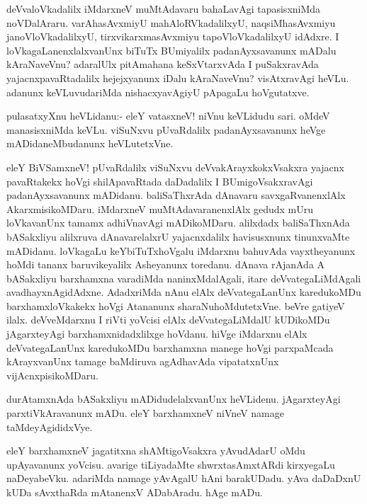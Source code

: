 \begin{mng}
deVvaloVkadalilx iMdarxneV muMtAdavaru bahaLavAgi tapasisxniMda noVDalAraru. varAhasAvxmiyU mahAloRVkadalilxyU, naqsiMhasAvxmiyu janoVloVkadalilxyU, tirxvikarxmasAvxmiyu tapoVloVkadalilxyU idAdxre. I loVkagaLanenxlalxvanUnx biTuTx BUmiyalilx padanAyxsavanunx mADalu kAraNaveVnu? adaralUlx pitAmahana keSxVtarxvAda I puSakxravAda yajacnxpavaRtadalilx hejejxyanunx iDalu kAraNaveVnu? visAtxravAgi heVLu. adanunx keVLuvudariMda nishacxyavAgiyU pApagaLu hoVgutatxve.
\end{mng}

\begin{mng}
pulasatxyXnu heVLidanu:- eleY vatasxneV! niVnu keVLidudu sari. oMdeV manasisxniMda keVLu. viSuNxvu pUvaRdalilx padanAyxsavanunx heVge mADidaneMbudanunx heVLutetxVne.
\end{mng}

\begin{mng}
eleY BiVSamxneV! pUvaRdalilx viSuNxvu deVvakArayxkokxVsakxra yajacnx pavaRtakekx hoVgi shilApavaRtada daDadalilx I BUmigoVsakxravAgi padanAyxsavanunx mADidanu. baliSaThxrAda dAnavaru savxgaRvanenxlAlx AkarxmisikoMDaru. iMdarxneV muMtAdavaranenxlAlx gedudx mUru loVkavanUnx tamamx adhiVnavAgi mADikoMDaru. alilxdadx baliSaThxnAda bASakxliyu alilxruva dAnavarelalxrU yajacnxdalilx havisusxnunx tinunxvaMte mADidanu. loVkagaLu keYbiTuTxhoVgalu iMdarxnu bahuvAda vayxtheyanunx hoMdi tananx baruvikeyalilx Asheyanunx toredanu. dAnava rAjanAda A bASakxliyu barxhamxna varadiMda naninxMdalAgali, itare deVvategaLiMdAgali avadhayxnAgidAdxne. AdadxriMda nAnu elAlx deVvategaLanUnx karedukoMDu barxhamxloVkakekx hoVgi Atananunx sharaNuhoMdutetxVne. beVre gatiyeV ilalx. deVveMdarxnu I riVti yoVcisi elAlx deVvategaLiMdalU kUDikoMDu jAgarxteyAgi barxhamxnidadxlilxge hoVdanu. hiVge iMdarxnu elAlx deVvategaLanUnx karedukoMDu barxhamxna manege hoVgi parxpaMcada kArayxvanUnx tamage baMdiruva agAdhavAda vipatatxnUnx vijAcnxpisikoMDaru.
\end{mng}

\begin{mng}
durAtamxnAda bASakxliyu mADidudelalxvanUnx heVLidenu. jAgarxteyAgi parxtiVkAravanunx mADu. eleY barxhamxneV niVneV namage taMdeyAgididxVye.
\end{mng}

\begin{mng}
eleY barxhamxneV jagatitxna shAMtigoVsakxra yAvudAdarU oMdu upAyavanunx yoVcisu. avarige tiLiyadaMte shwrxtasAmxtARdi kirxyegaLu naDeyabeVku. adariMda namage yAvAgalU hAni barakUDadu. yAva daDaDxnU kUDa sAvxthaRda mAtanenxV ADabAradu. hAge mADu.
\end{mng}


